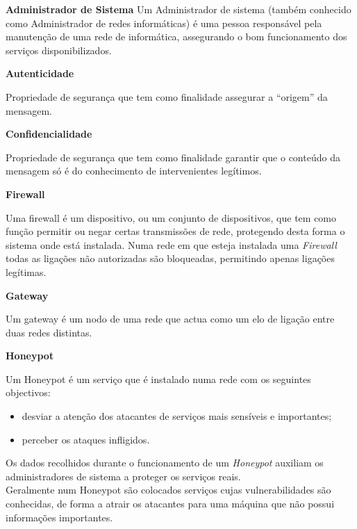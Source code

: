 \label{appendix:1}
\begin{description}
    \item \textbf{Administrador de Sistema}
    Um Administrador de sistema (também conhecido como Administrador de redes informáticas) é uma pessoa responsável pela manutenção de uma rede de informática, assegurando o bom funcionamento dos serviços disponibilizados. 
\end{description}

\begin{description}
    \item \textbf{Autenticidade}

    Propriedade de segurança que tem como finalidade assegurar a “origem” da mensagem.
\end{description}

\begin{description}
    \item \textbf{Confidencialidade}

    Propriedade de segurança que tem como finalidade garantir que o conteúdo da mensagem só é do conhecimento de intervenientes legítimos.
\end{description}

\begin{description}
    \item \textbf{Firewall}

    Uma firewall é um dispositivo, ou um conjunto de dispositivos, que tem como função permitir ou negar certas transmissões de rede, protegendo desta forma o sistema onde está instalada. Numa rede em que esteja instalada uma \textit{Firewall} todas as ligações não autorizadas são bloqueadas, permitindo apenas ligações legítimas.
\end{description}

\begin{description}
    \item \textbf{Gateway}
    
    Um gateway é um nodo de uma rede que actua como um elo de ligação entre duas redes distintas.
\end{description}

\begin{description}
    \item \textbf{Honeypot}

    Um Honeypot é um serviço que é instalado numa rede com os seguintes objectivos:
    \begin{itemize}
        \item desviar a atenção dos atacantes de serviços mais sensíveis e importantes;
        \item perceber os ataques infligidos.
    \end{itemize}
    
    Os dados recolhidos durante o funcionamento de um \textit{Honeypot} auxiliam os administradores de sistema a proteger os serviços reais.\\
    
    Geralmente num Honeypot são colocados serviços cujas vulnerabilidades são conhecidas, de forma a atrair os atacantes para uma máquina que não possui informações importantes.
\end{description}


